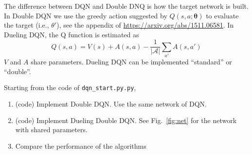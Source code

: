 \documentclass[a4paper]{article}
\begin{document}
The difference between DQN and Double DNQ is how the target network is built. In Double DQN we use the greedy action suggested by $Q(s,a; \boldsymbol{\theta})$ to evaluate the target (i.e., $\theta'$), see the appendix of \url{https://arxiv.org/abs/1511.06581}.
In Dueling DQN, the Q function is estimated as
\[
    Q(s,a) = V(s) + A(s,a) - \frac{1}{|\mathcal{A}|} \sum_{a'} A(s,a')
\]
$V$ and $A$ share parameters.
Dueling DQN can be implemented ``standard'' or ``double''.

Starting from the code of \texttt{dqn\_start.py.py},
\begin{enumerate}
    \item (code) Implement Double DQN. Use the same network of DQN.
    \item (code) Implement Dueling Double DQN. See Fig.~\ref{fig:net} for the network with shared parameters.
    \item Compare the performance of the algorithms
\end{enumerate}



\end{document}
